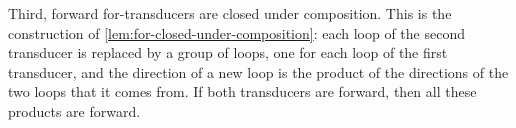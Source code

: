 {Third, forward for-transducers are closed under composition. This is the construction of \cref{lem:for-closed-under-composition}: each loop of the second transducer is replaced by a group of loops, one for each loop of the first transducer, and the direction of a new loop is the product of the directions of the two loops that it comes from. If both transducers are forward, then all these products are forward.
}